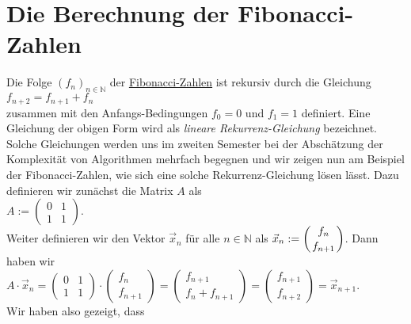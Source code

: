 \section{Die Berechnung der Fibonacci-Zahlen}
Die Folge $(f_n)_{n\in\mathbb{N}}$ der \href{http://de.wikipedia.org/wiki/Fibonacci-Folge}{Fibonacci-Zahlen} ist rekursiv durch die Gleichung
\\[0.2cm]
\hspace*{1.3cm}
$f_{n+2} = f_{n+1} + f_n$
\\[0.2cm]
zusammen mit den Anfangs-Bedingungen $f_0 = 0$ und $f_1 = 1$ definiert.   Eine Gleichung der obigen Form
wird als {\emph{\color{blue}lineare Rekurrenz-Gleichung}} bezeichnet.  Solche Gleichungen werden uns im zweiten
Semester bei der Absch\"atzung der Komplexit\"at von Algorithmen mehrfach begegnen und wir zeigen nun am Beispiel der
Fibonacci-Zahlen, wie sich eine solche Rekurrenz-Gleichung l\"osen l\"asst.  Dazu definieren wir
zun\"achst die Matrix $A$ als
\\[0.2cm]
\hspace*{1.3cm}
$A := \left(
  \begin{array}{ll}
    0 & 1 \\
    1 & 1 
  \end{array}
\right)
$.
\\
Weiter definieren wir den Vektor $\vec{x}_n$ f\"ur alle $n \in \mathbb{N}$ als 
$\displaystyle\vec{x}_n := \left(f_n \atop f_{n+1}\right)$.  Dann haben wir
\\[0.2cm]
\hspace*{1.3cm}
$A \cdot \vec{x}_n = \left(
  \begin{array}{ll}
    0 & 1 \\
    1 & 1 
  \end{array}
\right) \cdot \left(
  \begin{array}{c}
    f_n \\ f_{n+1}
  \end{array} 
\right) = 
\left(
  \begin{array}{c}
     f_{n+1} \\ f_n + f_{n+1}
  \end{array} 
\right) = \left(
  \begin{array}{c}
     f_{n+1} \\ f_{n+2}
  \end{array} 
\right) = \vec{x}_{n+1}.
$
\\[0.2cm]
Wir haben also gezeigt, dass
\\[0.2cm]
\hspace*{1.3cm}
